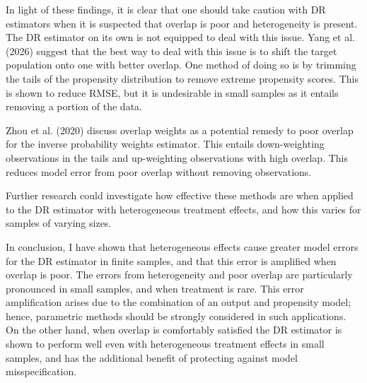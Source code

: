 \documentclass[12pt, oneside]{article}   	%
\begin{document}
In light of these findings, it is clear that one should take caution with DR estimators when it is suspected that overlap is poor and heterogeneity is present. The DR estimator on its own is not equipped to deal with this issue. Yang et al. (2026) suggest that the best way to deal with this issue is to shift the target population onto one with better overlap. One method of doing so is by trimming the tails of the propensity distribution to remove extreme propensity scores. This is shown to reduce RMSE, but it is undesirable in small samples as it entails removing a portion of the data.

Zhou et al. (2020) discuss overlap weights as a potential remedy to poor overlap for the inverse probability weights estimator. This entails down-weighting observations in the tails and up-weighting observations with high overlap. This reduces model error from poor overlap without removing observations.

Further research could investigate how effective these methods are when applied to the DR estimator with heterogeneous treatment effects, and how this varies for samples of varying sizes.

In conclusion, I have shown that heterogeneous effects cause greater model errors for the DR estimator in finite samples, and that this error is amplified when overlap is poor. The errors from heterogeneity and poor overlap are particularly pronounced in small samples, and when treatment is rare. This error amplification arises due to the combination of an output and propensity model; hence, parametric methods should be strongly considered in such applications. On the other hand, when overlap is comfortably satisfied the DR estimator is shown to perform well even with heterogeneous treatment effects in small samples, and has the additional benefit of protecting against model misspecification.
\end{document}
